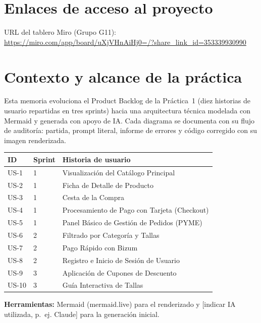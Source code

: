 \section{Enlaces de acceso al proyecto}
URL del tablero Miro (Grupo G11): \url{https://miro.com/app/board/uXjVHnAiHj0=/?share_link_id=353339930990}

\section{Contexto y alcance de la práctica}
Esta memoria evoluciona el Product Backlog de la Práctica~1 (diez historias de usuario repartidas en tres sprints) hacia una arquitectura técnica modelada con Mermaid y generada con apoyo de IA. Cada diagrama se documenta con su flujo de auditoría: partida, prompt literal, informe de errores y código corregido con su imagen renderizada.

\begin{center}\small
\begin{tabular}{@{}llp{9cm}@{}}
\toprule \textbf{ID} & \textbf{Sprint} & \textbf{Historia de usuario}\\ \midrule
US-1 & 1 & Visualización del Catálogo Principal\\
US-2 & 1 & Ficha de Detalle de Producto\\
US-3 & 1 & Cesta de la Compra\\
US-4 & 1 & Procesamiento de Pago con Tarjeta (Checkout)\\
US-5 & 1 & Panel Básico de Gestión de Pedidos (PYME)\\
US-6 & 2 & Filtrado por Categoría y Tallas\\
US-7 & 2 & Pago Rápido con Bizum\\
US-8 & 2 & Registro e Inicio de Sesión de Usuario\\
US-9 & 3 & Aplicación de Cupones de Descuento\\
US-10 & 3 & Guía Interactiva de Tallas\\
\bottomrule\end{tabular}
\end{center}

\textbf{Herramientas:} Mermaid (mermaid.live) para el renderizado y [indicar IA utilizada, p.~ej. Claude] para la generación inicial.
